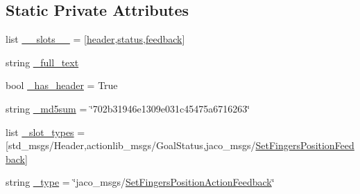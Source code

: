 \subsection*{Static Private Attributes}
\begin{DoxyCompactItemize}
\item 
list \hyperlink{classjaco__msgs_1_1msg_1_1__SetFingersPositionActionFeedback_1_1SetFingersPositionActionFeedback_af834ab141e1b2a6f1b4528ed520b93a5}{\+\_\+\+\_\+slots\+\_\+\+\_\+} = \mbox{[}\textquotesingle{}\hyperlink{classjaco__msgs_1_1msg_1_1__SetFingersPositionActionFeedback_1_1SetFingersPositionActionFeedback_a5992a948362f03290d7fe28bcfc30eb1}{header}\textquotesingle{},\textquotesingle{}\hyperlink{classjaco__msgs_1_1msg_1_1__SetFingersPositionActionFeedback_1_1SetFingersPositionActionFeedback_a714fac54f4393fce0f25761a151c9194}{status}\textquotesingle{},\textquotesingle{}\hyperlink{classjaco__msgs_1_1msg_1_1__SetFingersPositionActionFeedback_1_1SetFingersPositionActionFeedback_a52fa358274dca6ee01a81e9f5e1ebfa0}{feedback}\textquotesingle{}\mbox{]}
\item 
string \hyperlink{classjaco__msgs_1_1msg_1_1__SetFingersPositionActionFeedback_1_1SetFingersPositionActionFeedback_ac4dcfb87b8cbc77052da44e7d4b83ea2}{\+\_\+full\+\_\+text}
\item 
bool \hyperlink{classjaco__msgs_1_1msg_1_1__SetFingersPositionActionFeedback_1_1SetFingersPositionActionFeedback_aa2e9e9eb16bde70400fee18a3ae7f8cd}{\+\_\+has\+\_\+header} = True
\item 
string \hyperlink{classjaco__msgs_1_1msg_1_1__SetFingersPositionActionFeedback_1_1SetFingersPositionActionFeedback_a752afedeae87be9888ffa12de761da73}{\+\_\+md5sum} = \char`\"{}702b31946e1309e031c45475a6716263\char`\"{}
\item 
list \hyperlink{classjaco__msgs_1_1msg_1_1__SetFingersPositionActionFeedback_1_1SetFingersPositionActionFeedback_ab7d26cf37b2389bd5aeee2a36341e61f}{\+\_\+slot\+\_\+types} = \mbox{[}\textquotesingle{}std\+\_\+msgs/Header\textquotesingle{},\textquotesingle{}actionlib\+\_\+msgs/Goal\+Status\textquotesingle{},\textquotesingle{}jaco\+\_\+msgs/\hyperlink{classjaco__msgs_1_1msg_1_1__SetFingersPositionFeedback_1_1SetFingersPositionFeedback}{Set\+Fingers\+Position\+Feedback}\textquotesingle{}\mbox{]}
\item 
string \hyperlink{classjaco__msgs_1_1msg_1_1__SetFingersPositionActionFeedback_1_1SetFingersPositionActionFeedback_a18d6f18cc8437a778ff309dbab76f6c9}{\+\_\+type} = \char`\"{}jaco\+\_\+msgs/\hyperlink{classjaco__msgs_1_1msg_1_1__SetFingersPositionActionFeedback_1_1SetFingersPositionActionFeedback}{Set\+Fingers\+Position\+Action\+Feedback}\char`\"{}
\end{DoxyCompactItemize}


